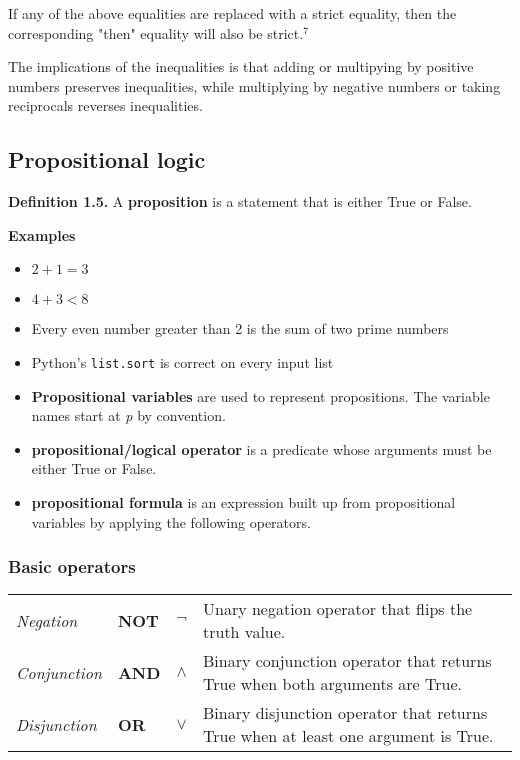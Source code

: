 \documentclass{article}
\begin{document}
If any of the above equalities are replaced with a strict equality, then the 
corresponding "then" equality will also be strict.$^7$

The implications of the inequalities is that adding or multipying by positive
numbers preserves inequalities, while multiplying by negative numbers or
taking reciprocals reverses inequalities. 


\subsection{Propositional logic}
\textbf{Definition 1.5.} A \textbf{proposition} is a statement that is either
True or False.

\textbf{Examples} 
\begin{itemize}
    \item $ 2 + 1 = 3$
    \item $ 4 + 3 < 8$
    \item Every even number greater than 2 is the sum of two prime numbers
    \item Python's \verb|list.sort| is correct on every input list
    
\end{itemize}
\begin{itemize}[itemsep=0pt] 
    \renewcommand{\labelitemi}{} %
    \footnotesize %
    \item \textbf{Propositional variables} are used to represent propositions. The variable
    names start at \emph{p} by convention.  
    \item \textbf{propositional/logical operator} is a predicate whose arguments 
    must be either True or False.
    \item \textbf{propositional formula} is an expression built up from propositional
    variables by applying the following operators.
\end{itemize}

\subsubsection*{Basic operators}
\begin{tabular}{|p{2cm} p{1cm} p{1cm} p{7cm}|}
    \textit{Negation} & \textbf{NOT} & $\neg$ & Unary negation operator that flips the truth value. \\
    \textit{Conjunction} & \textbf{AND} & $\land$ & Binary conjunction operator that returns True when both
    arguments are True. \\
    \textit{Disjunction} & \textbf{OR} & $\lor$ & Binary disjunction operator that returns True when at least
    one argument is True. \\
\end{tabular}
\end{document}
